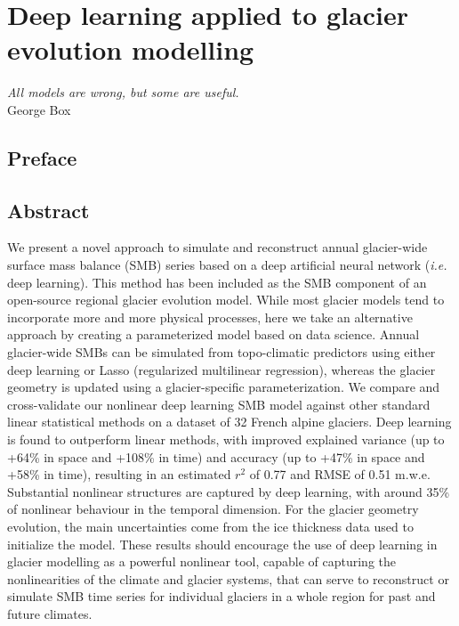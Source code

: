\chapter{Deep learning applied to glacier evolution modelling}
\label{chap:methods}

\begin{flushright}
\begin{small}
\textit{All models are wrong, but some are useful.}\\
George Box
\end{small}
\end{flushright}

\section*{Preface}

\section{Abstract}
We present a novel approach to simulate and reconstruct annual glacier-wide surface mass balance (SMB) series based on a deep artificial neural network (\textit{i.e.} deep learning). This method has been included as the SMB component of an open-source regional glacier evolution model. While most glacier models tend to incorporate more and more physical processes, here we take an alternative approach by creating a parameterized model based on data science. Annual glacier-wide SMBs can be simulated from topo-climatic predictors using either deep learning or Lasso (regularized multilinear regression), whereas the glacier geometry is updated using a glacier-specific parameterization. We compare and cross-validate our nonlinear deep learning SMB model against other standard linear statistical methods on a dataset of 32 French alpine glaciers. Deep learning is found to outperform linear methods, with improved explained variance (up to +64\% in space and +108\% in time) and accuracy (up to +47\% in space and +58\% in time), resulting in an estimated \(r^2\) of 0.77 and RMSE of 0.51 m.w.e. Substantial nonlinear structures are captured by deep learning, with around 35\% of nonlinear behaviour in the temporal dimension. For the glacier geometry evolution, the main uncertainties come from the ice thickness data used to initialize the model. These results should encourage the use of deep learning in glacier modelling as a powerful nonlinear tool, capable of capturing the nonlinearities of the climate and glacier systems, that can serve to reconstruct or simulate SMB time series for individual glaciers in a whole region for past and future climates. 


